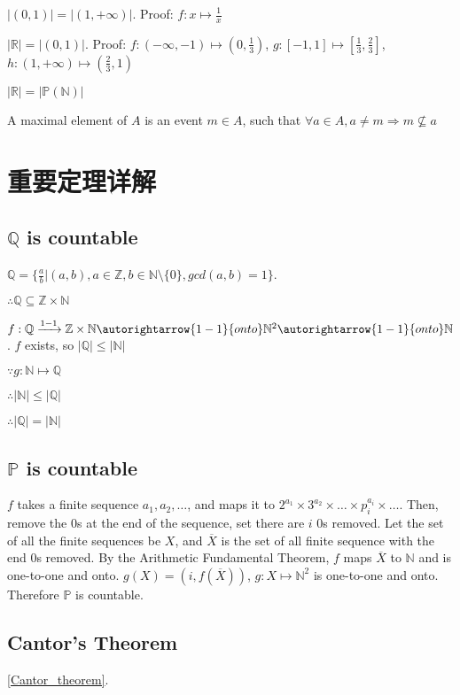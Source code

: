 \documentclass[12pt,a4paper]{ctexrep}
\begin{document}
$|(0,1)| = |(1,+\infty)|$. Proof: $f: x \mapsto \frac{1}{x}$

$|\mathbb{R}| = |(0,1)|$. Proof: $f: (-\infty,-1)\mapsto(0,\frac{1}{3})$, $g: [-1,1]\mapsto[\frac{1}{3},\frac{2}{3}]$, $h: (1,+\infty)\mapsto(\frac{2}{3},1)$

$|\mathbb{R}| = |\mathbb{P}(\mathbb{N})|$

A maximal element of $A$ is an event $m \in A$, such that $\forall a \in A, a \neq m \Rightarrow m \nsubseteq a$

\section{重要定理详解}
\subsection{$\mathbb{Q}$ is countable} 
$\mathbb{Q} = \{\frac{a}{b}|(a,b),a \in \mathbb{Z},b\in \mathbb{N}\setminus\{0\},gcd(a,b) = 1\}$. 

$\therefore \mathbb{Q} \subseteq \mathbb{Z}\times \mathbb{N}$

$f: \mathbb{Q}\xrightarrow{1-1}\mathbb{Z}\times\mathbb{N}\autorightarrow{1-1}{onto}\mathbb{N}^2\autorightarrow{1-1}{onto}\mathbb{N}$. $f$ exists, so $|\mathbb{Q}|\leqslant|\mathbb{N}|$

$\because g:\mathbb{N}\mapsto \mathbb{Q}$

$\therefore |\mathbb{N}|\leqslant|\mathbb{Q}|$

$\therefore |\mathbb{Q}| = |\mathbb{N}|$
\subsection{$\mathbb{P}$ is countable}
$f$ takes a finite sequence $a_1,a_2,\dots$, and maps it to $2^{a_1}\times3^{a_2}\times\dots\times p_i^{a_i} \times\dots$. Then, remove the 0s at the end of the sequence, set there are $i$ 0s removed. Let the set of all the finite sequences be $X$, and $\overline{X}$ is the set of all finite sequence with the end 0s removed. By the Arithmetic Fundamental Theorem, $f$ maps $\overline{X}$ to $\mathbb{N}$ and is one-to-one and onto. $g(X) = (i,f(\overline{X}))$, $g:X \mapsto \mathbb{N}^2$ is one-to-one and onto. Therefore $\mathbb{P}$ is countable.

\subsection{Cantor's Theorem}\label{Cantor_proof}
\hyperlink{Cantor_theorem}{\ref{Cantor_theorem}}. \hypertarget{Cantor_proof}{}
\end{document}
